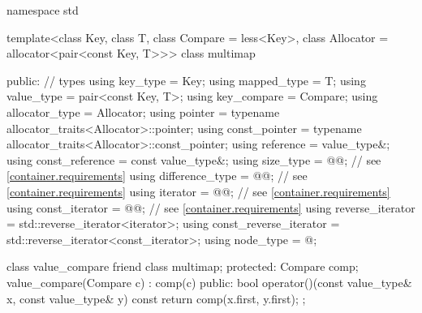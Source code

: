%
%
\begin{codeblock}
namespace std {
  template<class Key, class T, class Compare = less<Key>,
           class Allocator = allocator<pair<const Key, T>>>
  class multimap {
  public:
    // types
    using key_type               = Key;
    using mapped_type            = T;
    using value_type             = pair<const Key, T>;
    using key_compare            = Compare;
    using allocator_type         = Allocator;
    using pointer                = typename allocator_traits<Allocator>::pointer;
    using const_pointer          = typename allocator_traits<Allocator>::const_pointer;
    using reference              = value_type&;
    using const_reference        = const value_type&;
    using size_type              = @@; // see \ref{container.requirements}
    using difference_type        = @@; // see \ref{container.requirements}
    using iterator               = @@; // see \ref{container.requirements}
    using const_iterator         = @@; // see \ref{container.requirements}
    using reverse_iterator       = std::reverse_iterator<iterator>;
    using const_reverse_iterator = std::reverse_iterator<const_iterator>;
    using node_type              = @\unspec@;

    class value_compare {
      friend class multimap;
    protected:
      Compare comp;
      value_compare(Compare c) : comp(c) { }
    public:
      bool operator()(const value_type& x, const value_type& y) const {
        return comp(x.first, y.first);
      }
    };

}}
\end{codeblock}
